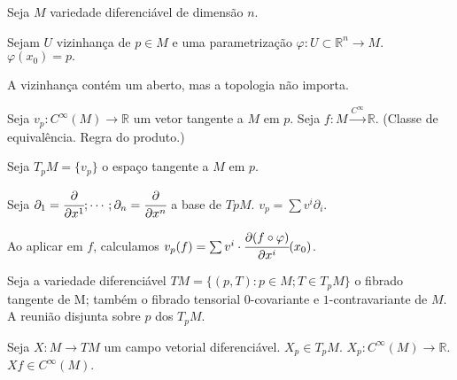 \documentclass[10pt,a4paper]{article}
\begin{document}
		Seja $M$ variedade diferenci\'avel de dimens\~ao $n$.

		Sejam $U$ vizinhan\c{c}a de $p \in M$ e uma parametriza\c{c}\~ao $\varphi: U \subset \mathbb{R}^n \rightarrow M$. $\varphi(x_0) = p.$

		A vizinhan\c{c}a cont\'em um aberto, mas a topologia n\~ao importa.

		Seja $v_p : C^\infty(M) \rightarrow \mathbb{R}$ um vetor tangente a $M$ em $p$. Seja $f : M \stackrel{C^\infty}{\longrightarrow} \mathbb{R}$. (Classe de equival\^encia. Regra do produto.)

		Seja $T_pM = \{v_p \}$ o espa\c{c}o tangente a $M$ em $p$.

		Seja $\partial_1 = \cfrac{\partial}{\partial x^1} ; \cdots ; \partial_n = \cfrac{\partial}{\partial x^n}$ a base de $TpM$. $v_p = \sum v^i \partial_i$.

		Ao aplicar em $f$, calculamos $v_p(f) = \sum v^i \cdot \cfrac{\partial (f \circ \varphi)}{\partial x^i} (x_0)$.

		Seja a variedade diferenci\'avel $TM = \{ (p, T): p \in M ; T \in T_pM \}$ o fibrado tangente de M; tamb\'em o fibrado tensorial $0$-covariante e $1$-contravariante de $M$. A reuni\~ao disjunta sobre $p$ dos $T_pM$.

		Seja $X: M \rightarrow TM$ um campo vetorial diferenci\'avel. $X_p \in T_pM$. $X_p : C^\infty(M) \rightarrow \mathbb{R}$. $Xf \in C^\infty(M)$.

		\begin{center}
		\end{center}
\end{document}
